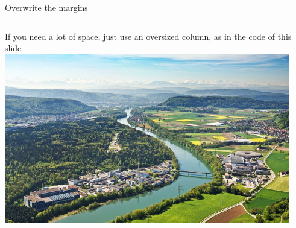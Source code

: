 \documentclass[aspectratio=43]{beamer} %
\begin{document}
\begin{frame}{Overwrite the margins}
\begin{columns}
  \begin{column}{1.2\linewidth}
     If you need a lot of space, just use an oversized column, as in the code of this slide
     \includegraphics[width=12.5cm]{PSIlandscape}
  \end{column}
\end{columns}
\end{frame}

  
\end{document}
